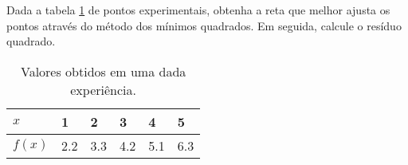 %
%
%
%
%
%
%
%
%
%
%
%
%
%
%
%
%
%
%
%
%
%
%

\begin{ex}
Dada a tabela \ref{experimentos.residuo} de pontos experimentais, obtenha a reta que melhor ajusta os pontos através do método dos mínimos quadrados. Em seguida, calcule o resíduo quadrado.
\begin{table}[hbt]
\centering
\caption{Valores obtidos em uma dada experiência.}
\label{experimentos.residuo}
\begin{tabular}{@{}llllll@{}}
\toprule
$x$	& 1	& 2   & 3		& 4   & 5          \\ \midrule
$f(x)$		& 2.2	& 3.3 & 4.2	& 5.1 & 6.3   \\ \bottomrule
\end{tabular}
\end{table}

\end{ex}

%
%

